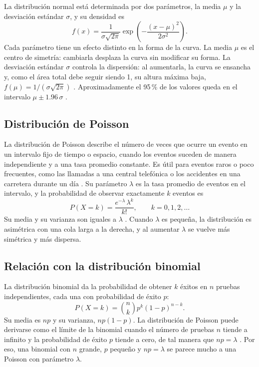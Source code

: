 \documentclass[11pt,letterpaper]{article}
\begin{document}
La distribución normal está determinada por dos parámetros, la media $\mu$ y la desviación estándar $\sigma$, y su densidad es
\begin{equation}
    f(x) = \frac{1}{\sigma \sqrt{2\pi}} \exp\!\left( -\frac{(x - \mu)^2}{2\sigma^2} \right).
\end{equation}
Cada parámetro tiene un efecto distinto en la forma de la curva. La media $\mu$ es el centro de simetría: cambiarla desplaza la curva sin modificar su forma. La desviación estándar $\sigma$ controla la dispersión: al aumentarla, la curva se ensancha y, como el área total debe seguir siendo 1, su altura máxima baja, $f(\mu) = 1/(\sigma\sqrt{2\pi})$ \parencite{bonamente2017}. Aproximadamente el 95\,\% de los valores queda en el intervalo $\mu \pm 1.96\,\sigma$ \parencite{bonamente2017}.

\subsection{Distribución de Poisson}

La distribución de Poisson describe el número de veces que ocurre un evento en un intervalo fijo de tiempo o espacio, cuando los eventos suceden de manera independiente y a una tasa promedio constante. Es útil para eventos raros o poco frecuentes, como las llamadas a una central telefónica o los accidentes en una carretera durante un día \parencite{tecnm2026_documento_fuente}. Su parámetro $\lambda$ es la tasa promedio de eventos en el intervalo, y la probabilidad de observar exactamente $k$ eventos es
\begin{equation}
    P(X = k) = \frac{e^{-\lambda}\,\lambda^k}{k!}, \qquad k = 0, 1, 2, \ldots
\end{equation}
Su media y su varianza son iguales a $\lambda$ \parencite{rice2006}. Cuando $\lambda$ es pequeña, la distribución es asimétrica con una cola larga a la derecha, y al aumentar $\lambda$ se vuelve más simétrica y más dispersa.

\subsection{Relación con la distribución binomial}

La distribución binomial da la probabilidad de obtener $k$ éxitos en $n$ pruebas independientes, cada una con probabilidad de éxito $p$:
\begin{equation}
    P(X = k) = \binom{n}{k} p^k (1 - p)^{n-k}.
\end{equation}
Su media es $np$ y su varianza, $np(1 - p)$. La distribución de Poisson puede derivarse como el límite de la binomial cuando el número de pruebas $n$ tiende a infinito y la probabilidad de éxito $p$ tiende a cero, de tal manera que $np = \lambda$ \parencite{tecnm2026_documento_fuente}. Por eso, una binomial con $n$ grande, $p$ pequeño y $np = \lambda$ se parece mucho a una Poisson con parámetro $\lambda$.
\end{document}
